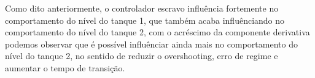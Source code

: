 Como dito anteriormente, o controlador escravo influência fortemente no comportamento do nível do tanque 1,
que também acaba influênciando no comportamento do nível do tanque 2, com o acréscimo da componente derivativa
podemos observar que é possível influênciar ainda mais no comportamento do nível do tanque 2, no sentido de
reduzir o overshooting, erro de regime e aumentar o tempo de transição.